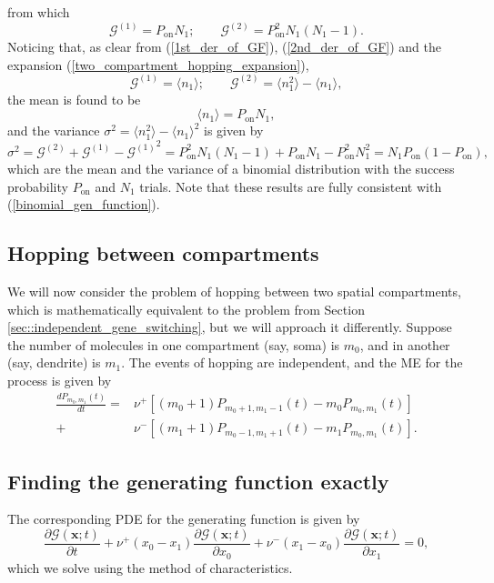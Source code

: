 \documentclass[a4paper, 11pt]{article}
\begin{document}
from which
\begin{equation*}
  \mathcal G^{(1)} = P_{\text{on}}N_1; \qquad     \mathcal G^{(2)} = P_{\text{on}}^2N_1(N_1-1).
\end{equation*}
Noticing that, as clear from (\ref{1st_der_of_GF}), (\ref{2nd_der_of_GF}) and the expansion (\ref{two_compartment_hopping_expansion}),
\begin{equation*}
  \mathcal G^{(1)} = \langle n_1 \rangle; \qquad \mathcal G^{(2)} = \langle n_1^2 \rangle - \langle n_1 \rangle,
\end{equation*}
the mean is found to be
\begin{equation*}
  \langle n_1\rangle = P_{\text{on}}N_1,
\end{equation*}
and the variance $\sigma^2 = \langle n_1^2 \rangle - \langle n_1 \rangle^2$ is given by
\begin{equation*}
  \sigma^2 = \mathcal G^{(2)} + \mathcal G^{(1)} - {\mathcal G^{(1)}}^2 = P_{\text{on}}^2N_1(N_1-1) + P_{\text{on}}N_1 - P_{\text{on}}^2N_1^2 = N_1P_{\text{on}}(1-P_{\text{on}}),
\end{equation*}
which are the mean and the variance of a binomial distribution with the success probability $P_{\text{on}}$ and $N_1$ trials. Note that these results are fully consistent with (\ref{binomial_gen_function}).

\subsection{Hopping between compartments}
We will now consider the problem of hopping between two spatial compartments, which is mathematically equivalent to the problem from Section \ref{sec::independent_gene_switching}, but we will approach it differently. Suppose the number of molecules in one compartment (say, soma) is $m_0$, and in another (say, dendrite) is $m_1$. The events of hopping are independent, and the ME for the process is given by
\begin{equation*}
  \begin{split}
    \frac{dP_{m_0, m_1}(t)}{dt} = &\nu^+\left[(m_0+1)P_{m_0+1,m_1-1}(t)-m_0P_{m_0,m_1}(t)\right]\\ + &\nu^-\left[(m_1+1)P_{m_0-1, m_1+1}(t) - m_1P_{m_0, m_1}(t)\right].
  \end{split}
\end{equation*}

\subsection{Finding the generating function exactly}
The corresponding PDE for the generating function is given by
\begin{equation}\label{hopping_PDE}
  \frac{\partial\mathcal G(\mathbf x; t)}{\partial t} + \nu^+(x_0-x_1)\frac{\partial\mathcal G(\mathbf x; t)}{\partial x_0} + \nu^-(x_1-x_0)\frac{\partial\mathcal G(\mathbf x; t)}{\partial x_1} = 0,
\end{equation}
which we solve using the method of characteristics.
\end{document}
